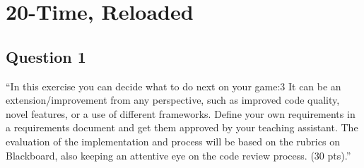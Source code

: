 \chapter{20-Time, Reloaded}
\section{Question 1}

``In this exercise you can decide what to do next on your game:3
It can be an extension/improvement from any perspective, such as improved code quality, novel features, or a use of different frameworks. Define your own requirements in a requirements document and get them approved by your teaching assistant. The evaluation of the implementation and process will be based on the rubrics on Blackboard, also keeping an attentive eye on the code review process. (30 pts).''